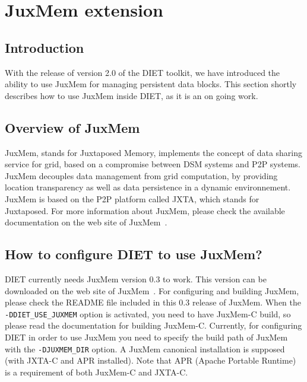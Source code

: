 
\chapter{JuxMem extension}
\label{ch:juxmem}

\section{Introduction}

With the release of version 2.0 of the DIET toolkit, we have introduced the
ability to use JuxMem for managing persistent data blocks. This
section shortly describes how to use JuxMem inside DIET, as it is an
on going work.

\section{Overview of JuxMem}

JuxMem, stands for Juxtaposed Memory, implements the concept of data
sharing service for grid, based on a compromise between DSM systems
and P2P systems. JuxMem decouples data management from grid
computation, by providing location transparency as well as data
persistence in a dynamic environnement. JuxMem is based on the P2P
platform called JXTA, which stands for Juxtaposed. For more
information about JuxMem, please check the available documentation on
the web site of JuxMem~\cite{JuxMem}.

\section{How to configure DIET to use JuxMem?}

DIET currently needs JuxMem version 0.3 to work. This version can be
downloaded on the web site of JuxMem~\cite{JuxMem}. For configuring
and building JuxMem, please check the README file included in this
0.3 release of JuxMem. When the \texttt{-DDIET_USE_JUXMEM} option is
activated, you need to have JuxMem-C build, so please read the
documentation for building JuxMem-C. Currently, for configuring DIET
in order to use JuxMem you need to specify the build path of JuxMem with
the \texttt{-DJUXMEM_DIR} option. A JuxMem canonical installation is
 supposed (with JXTA-C and APR installed).
Note that APR (Apache Portable Runtime) is a requirement of both
JuxMem-C and JXTA-C.

